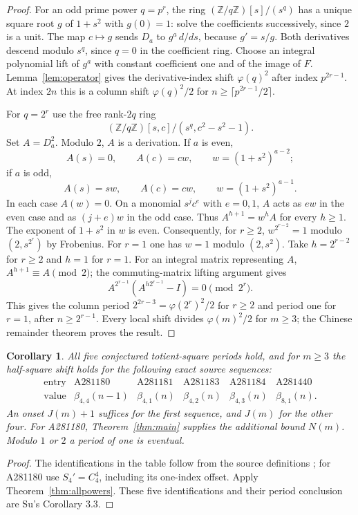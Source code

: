 \documentclass[11pt]{article}
\newtheorem{corollary}[theorem]{Corollary}
\newcommand{\Z}{\mathbb Z}
\newcommand{\ph}{\varphi}
\begin{document}
\begin{proof}
For an odd prime power $q=p^r$, the ring
$(\Z/q\Z)[s]/(s^q)$ has a unique square root $g$ of $1+s^2$
with $g(0)=1$: solve the coefficients successively, since $2$ is a unit.
The map $c\mapsto g$ sends $D_a$ to $g^a\,d/ds$, because
$g'=s/g$. Both derivatives descend modulo $s^q$, since $q=0$
in the coefficient ring. Choose an integral polynomial lift of $g^a$
with constant coefficient one and of the image of $F$.
Lemma~\ref{lem:operator} gives the derivative-index shift $\ph(q)^2$
after index $p^{2r-1}$. At index $2n$ this is a column shift
$\ph(q)^2/2$ for $n\ge\lceil p^{2r-1}/2\rceil$.

For $q=2^r$ use the free rank-$2q$ ring
\[
 (\Z/q\Z)[s,c]/(s^q,c^2-s^2-1).
\]
Set $A=D_a^2$. Modulo $2$, $A$ is a derivation. If $a$ is even,
\[
 A(s)=0,\qquad A(c)=cw,\qquad w=(1+s^2)^{a-2};
\]
if $a$ is odd,
\[
 A(s)=sw,\qquad A(c)=cw,\qquad w=(1+s^2)^{a-1}.
\]
In each case $A(w)=0$. On a monomial $s^jc^e$ with $e=0,1$,
$A$ acts as $ew$ in the even case and as $(j+e)w$ in the odd case.
Thus $A^{h+1}=w^h A$ for every $h\ge1$.
The exponent of $1+s^2$ in $w$ is even. Consequently, for $r\ge2$,
$w^{2^{r-2}}=1$ modulo $(2,s^{2^r})$ by Frobenius.
For $r=1$ one has $w=1$ modulo $(2,s^2)$.
Take $h=2^{r-2}$ for $r\ge2$ and $h=1$ for $r=1$.
For an integral matrix representing $A$,
$A^{h+1}\equiv A\pmod2$; the commuting-matrix lifting argument gives
\[
 A^{2^{r-1}}(A^{h2^{r-1}}-I)=0\pmod{2^r}.
\]
This gives the column period $2^{2r-3}=\ph(2^r)^2/2$ for $r\ge2$
and period one for $r=1$, after $n\ge2^{r-1}$.
Every local shift divides $\ph(m)^2/2$ for $m\ge3$;
the Chinese remainder theorem proves the result.
\end{proof}

\begin{corollary}\label{cor:companions}
All five conjectured totient-square periods hold, and for $m\ge3$
the half-square shift holds for the following exact source sequences:
\[
\begin{array}{c|ccccc}
 \text{entry}&\mathrm{A281180}&\mathrm{A281181}&\mathrm{A281183}&\mathrm{A281184}&\mathrm{A281440}\\
 \text{value}&\beta_{4,4}(n-1)&\beta_{4,1}(n)&\beta_{4,2}(n)&\beta_{4,3}(n)&\beta_{8,1}(n).
\end{array}
\]
An onset $J(m)+1$ suffices for the first sequence, and $J(m)$
for the other four. For A281180, Theorem~\ref{thm:main} supplies the
additional bound $N(m)$. Modulo $1$ or $2$ a period of one is eventual.
\end{corollary}
\begin{proof}
The identifications in the table follow from the source definitions
\cite{oeis180,oeis181,oeis183,oeis184,oeis440}; for A281180 use
$S_4'=C_4^4$, including its one-index offset. Apply
Theorem~\ref{thm:allpowers}. These five identifications and their
period conclusion are Su's Corollary 3.3.
\end{proof}
\end{document}

